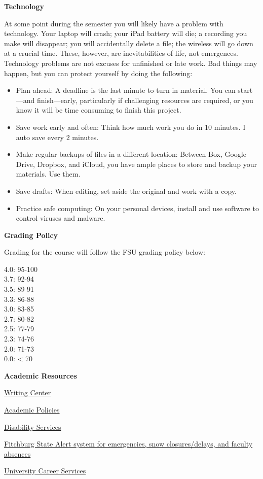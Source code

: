 \documentclass[
  letterpaper,
  DIV=11,
  numbers=noendperiod,
  oneside]{scrartcl}
\begin{document}
\textbf{Technology}

At some point during the semester you will likely have a problem with
technology. Your laptop will crash; your iPad battery will die; a
recording you make will disappear; you will accidentally delete a file;
the wireless will go down at a crucial time. These, however, are
inevitabilities of life, not emergences. Technology problems are not
excuses for unfinished or late work. Bad things may happen, but you can
protect yourself by doing the following:

\begin{itemize}
\item
  Plan ahead: A deadline is the last minute to turn in material. You can
  start---and finish---early, particularly if challenging resources are
  required, or you know it will be time consuming to finish this
  project.
\item
  Save work early and often: Think how much work you do in 10 minutes. I
  auto save every 2 minutes.
\item
  Make regular backups of files in a different location: Between Box,
  Google Drive, Dropbox, and iCloud, you have ample places to store and
  backup your materials. Use them.
\item
  Save drafts: When editing, set aside the original and work with a
  copy.
\item
  Practice safe computing: On your personal devices, install and use
  software to control viruses and malware.
\end{itemize}

\textbf{Grading Policy}

Grading for the course will follow the FSU grading policy below:

4.0: 95-100\\
3.7: 92-94\\
3.5: 89-91\\
3.3: 86-88\\
3.0: 83-85\\
2.7: 80-82\\
2.5: 77-79\\
2.3: 74-76\\
2.0: 71-73\\
0.0: \textless{} 70

\textbf{Academic Resources}

\href{http://www.fitchburgstate.edu/offices-services-directory/tutor-center/writing-help/}{Writing
Center}

\href{http://catalog.fitchburgstate.edu/content.php?catoid=13&navoid=851}{Academic
Policies}

\href{http://www.fitchburgstate.edu/offices-services-directory/disability-services/}{Disability
Services}

\href{https://www.getrave.com/login/fitchburgstate/}{Fitchburg State
Alert system for emergencies, snow closures/delays, and faculty
absences}

\href{http://www.fitchburgstate.edu/offices-services-directory/career-counseling-and-advising/careerservices/}{University
Career Services}
\end{document}

